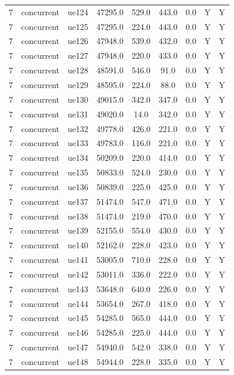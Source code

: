 \begin{table}[ht]
\begin{tabular}{|c|c|c|c|c|c|c|c|c|}
7 & concurrent & ue124 & 47295.0 & 529.0 & 443.0 & 0.0 & Y & Y \\
7 & concurrent & ue125 & 47295.0 & 224.0 & 443.0 & 0.0 & Y & Y \\
7 & concurrent & ue126 & 47948.0 & 539.0 & 432.0 & 0.0 & Y & Y \\
7 & concurrent & ue127 & 47948.0 & 220.0 & 433.0 & 0.0 & Y & Y \\
7 & concurrent & ue128 & 48591.0 & 546.0 & 91.0 & 0.0 & Y & Y \\
7 & concurrent & ue129 & 48595.0 & 224.0 & 88.0 & 0.0 & Y & Y \\
7 & concurrent & ue130 & 49015.0 & 342.0 & 347.0 & 0.0 & Y & Y \\
7 & concurrent & ue131 & 49020.0 & 14.0 & 342.0 & 0.0 & Y & Y \\
7 & concurrent & ue132 & 49778.0 & 426.0 & 221.0 & 0.0 & Y & Y \\
7 & concurrent & ue133 & 49783.0 & 116.0 & 221.0 & 0.0 & Y & Y \\
7 & concurrent & ue134 & 50209.0 & 220.0 & 414.0 & 0.0 & Y & Y \\
7 & concurrent & ue135 & 50833.0 & 524.0 & 230.0 & 0.0 & Y & Y \\
7 & concurrent & ue136 & 50839.0 & 225.0 & 425.0 & 0.0 & Y & Y \\
7 & concurrent & ue137 & 51474.0 & 547.0 & 471.0 & 0.0 & Y & Y \\
7 & concurrent & ue138 & 51474.0 & 219.0 & 470.0 & 0.0 & Y & Y \\
7 & concurrent & ue139 & 52155.0 & 554.0 & 430.0 & 0.0 & Y & Y \\
7 & concurrent & ue140 & 52162.0 & 228.0 & 423.0 & 0.0 & Y & Y \\
7 & concurrent & ue141 & 53005.0 & 710.0 & 228.0 & 0.0 & Y & Y \\
7 & concurrent & ue142 & 53011.0 & 336.0 & 222.0 & 0.0 & Y & Y \\
7 & concurrent & ue143 & 53648.0 & 640.0 & 226.0 & 0.0 & Y & Y \\
7 & concurrent & ue144 & 53654.0 & 267.0 & 418.0 & 0.0 & Y & Y \\
7 & concurrent & ue145 & 54285.0 & 565.0 & 444.0 & 0.0 & Y & Y \\
7 & concurrent & ue146 & 54285.0 & 225.0 & 444.0 & 0.0 & Y & Y \\
7 & concurrent & ue147 & 54940.0 & 542.0 & 338.0 & 0.0 & Y & Y \\
7 & concurrent & ue148 & 54944.0 & 228.0 & 335.0 & 0.0 & Y & Y \\

\end{tabular}
\end{table}
